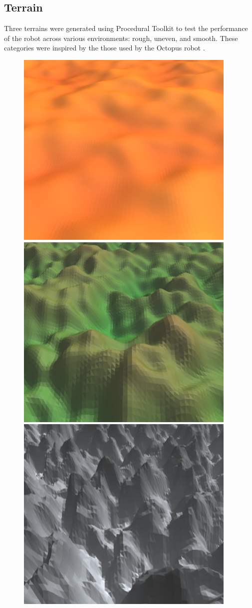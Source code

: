 \documentclass{article}
\begin{document}
\subsection{Terrain}
Three terrains were generated using Procedural Toolkit  to test the performance of the robot across various environments: rough, uneven, and smooth. These categories were inspired by the those used by the Octopus robot .\\
\begin{figure}[h]
\centering
\includegraphics[scale=0.3]{smoothTerrain}
\includegraphics[scale=0.3]{unevenTerrain}
\includegraphics[scale=0.3]{roughTerrain}

\end{figure}
\end{document}
